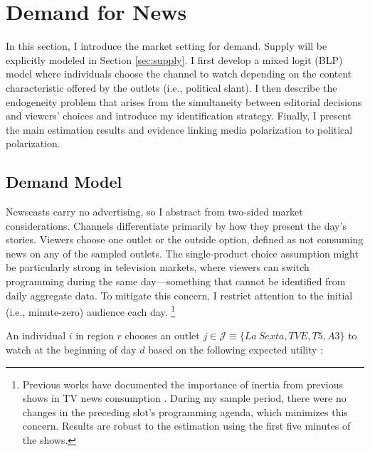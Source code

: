 \documentclass[12pt]{article}
\begin{document}
	
	
	
	
	
	
	
	

	
	
	\section{Demand for News}	\label{sec:demand}

In this section, I introduce the market setting for demand. Supply will be explicitly modeled in Section \ref{sec:supply}. I first develop a mixed logit (BLP) model \citep{berry_blp} where individuals choose the channel to watch depending on the content characteristic offered by the outlets (i.e., political slant). I then describe the endogeneity problem that arises from the simultaneity between editorial decisions and viewers' choices and introduce my identification strategy. Finally, I present the main estimation results and evidence linking media polarization to political polarization. 

	\subsection{Demand Model}




Newscasts carry no advertising, so I abstract from two-sided market considerations. Channels differentiate primarily by how they present the day’s stories. Viewers choose one outlet or the outside option, defined as not consuming news on any of the sampled outlets. The single-product choice assumption might be particularly strong in television markets, where viewers can switch programming during the same day—something that cannot be identified from daily aggregate data. To mitigate this concern, I restrict attention to the initial (i.e., minute-zero) audience each day. \footnote{Previous works have documented the importance of inertia from previous shows in TV news consumption \citep{richter2025structural}. During my sample period, there were no changes in the preceding slot's programming agenda, which minimizes this concern. Results are robust to the estimation using the first five minutes of the shows. }



	An individual $ i $  in region $r$ chooses an outlet $ j \in \mathcal{J}\equiv \{La \ Sexta,TVE,T5,A3\}$  to watch at the beginning of day $d$ based on the following expected utility : 
	
\end{document}

